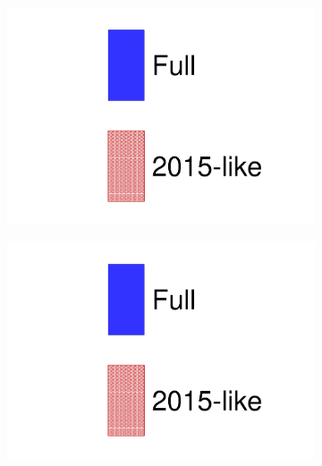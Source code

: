 \begin{figure}[h]
	\begin{subfigure}[t]{0.32\textwidth}
		\includegraphics[width=\textwidth, trim={0mm 0mm 0mm 0mm}, clip, page=1]{figures/mach3/data/alt/try_2017_fit_on_sk_spectra_posterior_sk_error_2015like_spectra}
	\end{subfigure}
	\begin{subfigure}[t]{0.32\textwidth}
		\includegraphics[width=\textwidth, trim={0mm 0mm 0mm 0mm}, clip, page=2]{figures/mach3/data/alt/try_2017_fit_on_sk_spectra_posterior_sk_error_2015like_spectra}
	\end{subfigure}
	\begin{subfigure}[t]{0.32\textwidth}

\end{subfigure}
\end{figure}
